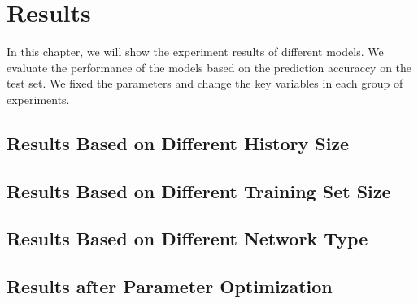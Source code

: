 \chapter{Results}
\label{chap:results}
In this chapter, we will show the experiment results of different models. We evaluate the performance of the models based on the prediction accuraccy on the test set. We fixed the parameters and change the key variables in each group of experiments.
 
\section{Results Based on Different History Size}
\label{results_history}

\section{Results Based on Different Training Set Size}
\label{results_size}

\section{Results Based on Different Network Type}
\label{results_type}

\section{Results after Parameter Optimization}
\label{resullts_para}


